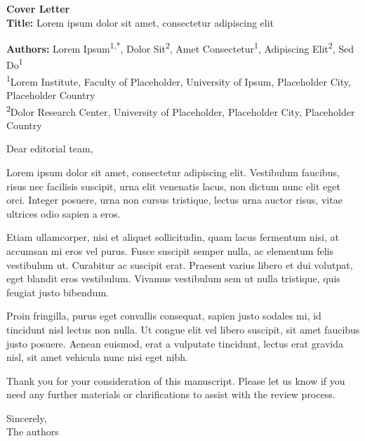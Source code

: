 \documentclass[a4paper, 12pt]{letter}
\begin{document}
\begin{center}
    \Large \textbf{Cover Letter} \\
    \vspace{0.5cm}
    \small
    \textbf{Title:} Lorem ipsum dolor sit amet, consectetur adipiscing elit \\
    \vspace{0.1cm}
    
    \textbf{Authors:} Lorem Ipsum\textsuperscript{1,*}, Dolor Sit\textsuperscript{2}, Amet Consectetur\textsuperscript{1}, Adipiscing Elit\textsuperscript{2}, Sed Do\textsuperscript{1} \\
    
    \vspace{0.1cm}
    \scriptsize
    \textsuperscript{1}Lorem Institute, Faculty of Placeholder, University of Ipsum, Placeholder City, Placeholder Country \\
    \textsuperscript{2}Dolor Research Center, University of Placeholder, Placeholder City, Placeholder Country \\
\end{center}

Dear editorial team,

Lorem ipsum dolor sit amet, consectetur adipiscing elit. Vestibulum faucibus, risus nec facilisis suscipit, urna elit venenatis lacus, non dictum nunc elit eget orci. Integer posuere, urna non cursus tristique, lectus urna auctor risus, vitae ultrices odio sapien a eros. 

\indent Etiam ullamcorper, nisi et aliquet sollicitudin, quam lacus fermentum nisi, at accumsan mi eros vel purus. Fusce suscipit semper nulla, ac elementum felis vestibulum ut. Curabitur ac suscipit erat. Praesent varius libero et dui volutpat, eget blandit eros vestibulum. Vivamus vestibulum sem ut nulla tristique, quis feugiat justo bibendum.

\indent Proin fringilla, purus eget convallis consequat, sapien justo sodales mi, id tincidunt nisl lectus non nulla. Ut congue elit vel libero suscipit, sit amet faucibus justo posuere. Aenean euismod, erat a vulputate tincidunt, lectus erat gravida nisl, sit amet vehicula nunc nisi eget nibh.

Thank you for your consideration of this manuscript. Please let us know if you need any further materials or clarifications to assist with the review process.

\closing{Sincerely, \\
The authors
}
\end{document}
